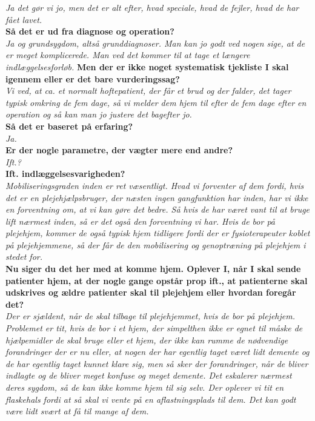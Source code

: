 \noindent
\textit{Ja det gør vi jo, men det er alt efter, hvad speciale, hvad de fejler, hvad de har fået lavet.}  \\
\noindent
\textbf{Så det er ud fra diagnose og operation?} \\
\noindent
\textit{Ja og grundsygdom, altså grunddiagnoser. Man kan jo godt ved nogen sige, at de er meget komplicerede. Man ved det kommer til at tage et længere indlæggelsesforløb.} 
\textbf{Men der er ikke noget systematisk tjekliste I skal igennem eller er det bare vurderingssag?} \\
\noindent
\textit{Vi ved, at ca. et normalt hoftepatient, der får et brud og der falder, det tager typisk omkring de fem dage, så vi melder dem hjem til efter de fem dage efter en operation og så kan man jo justere det bagefter jo.} \\
\noindent
\textbf{Så det er baseret på erfaring?} \\
\noindent
\textit{Ja.} \\
\noindent
\textbf{Er der nogle parametre, der vægter mere end andre? } \\
\noindent
\textit{Ift.?} \\
\noindent
\textbf{Ift. indlæggelsesvarigheden?} \\
\noindent
\textit{Mobiliseringsgraden inden er ret væsentligt. Hvad vi forventer af dem fordi, hvis det er en plejehjælpsbruger, der næsten ingen gangfunktion har inden, har vi ikke en forventning om, at vi kan gøre det bedre. Så hvis de har været vant til at bruge lift nærmest inden, så er det også den forventning vi har. Hvis de bor på plejehjem, kommer de også typisk hjem tidligere fordi der er fysioterapeuter koblet på plejehjemmene, så der får de den mobilisering og genoptræning på plejehjem i stedet for. } \\
\noindent
\textbf{Nu siger du det her med at komme hjem. Oplever I, når I skal sende patienter hjem, at der nogle gange opstår prop ift., at patienterne skal udskrives og ældre patienter skal til plejehjem eller hvordan foregår det? } \\
\noindent
\textit{Der er sjældent, når de skal tilbage til plejehjemmet, hvis de bor på plejehjem. Problemet er tit, hvis de bor i et hjem, der simpelthen ikke er egnet til måske de hjælpemidler de skal bruge eller et hjem, der ikke kan rumme de nødvendige forandringer der er nu eller, at nogen der har egentlig taget været lidt demente og de har egentlig taget kunnet klare sig, men så sker der forandringer, når de bliver indlagte og de bliver meget konfuse og meget demente. Det eskalerer nærmest deres sygdom, så de kan ikke komme hjem til sig selv. Der oplever vi tit en flaskehals fordi at så skal vi vente på en aflastningsplads til dem. Det kan godt være lidt svært at få til mange af dem.} \\
